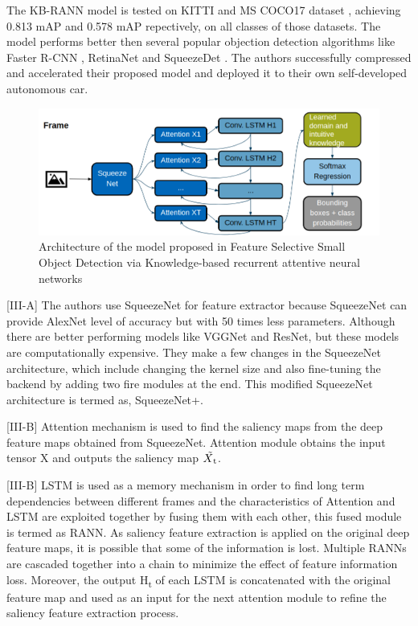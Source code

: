 \documentclass[conference]{IEEEtran}
\begin{document}
The KB-RANN model is tested on KITTI and MS COCO17 dataset \cite{b31}, achieving 0.813 mAP and 0.578 mAP repectively, on all classes of those datasets. The model performs better then several popular objection detection algorithms like Faster R-CNN \cite{b15}, RetinaNet \cite{b32} and SqueezeDet \cite{b33}.
The authors successfully compressed and accelerated their proposed model and deployed it to their own self-developed autonomous car. \newline

\begin{figure}[h]
\includegraphics[width=\columnwidth]{KB-RANN-architecture}
\caption{Architecture of the model proposed in Feature Selective Small Object Detection via Knowledge-based recurrent attentive neural networks}
\end{figure}

[III-A] The authors use SqueezeNet\cite{b34} for feature extractor because SqueezeNet can provide AlexNet\cite{b14} level of accuracy but with 50 times less parameters. Although there are better performing models like VGGNet\cite{b45} and ResNet\cite{b40}, but these models are computationally expensive. They make a few changes in the SqueezeNet architecture, which include changing the kernel size and also fine-tuning the backend by adding two fire modules at the end. This modified SqueezeNet architecture is termed as, SqueezeNet+. \newline

[III-B] Attention mechanism is used to find the saliency maps from the deep feature maps obtained from SqueezeNet. Attention module obtains the input tensor X and outputs the saliency map $\tilde{X\textsubscript{t}}$. \newline

[III-B] LSTM \cite{b18} is used as a memory mechanism in order to find long term dependencies between different frames and the characteristics of Attention and LSTM are exploited together by fusing them with each other, this fused module is termed as RANN. As saliency feature extraction is applied on the original deep feature maps, it is possible that some of the information is lost. Multiple RANNs are cascaded together into a chain to minimize the effect of feature information loss. Moreover, the output H\textsubscript{t} of each LSTM is concatenated with the original feature map and used as an input for the next attention module to refine the saliency feature extraction process. \newline
\end{document}
